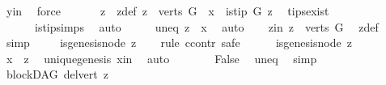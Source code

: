 \begin{isabellebody}
\ y{\isacharunderscore}{\kern0pt}in\ \isamarkupfalse%
\ force\ \isanewline
\ \ \isamarkupfalse%
\ \isamarkupfalse%
\ z\ \ z{\isacharunderscore}{\kern0pt}def{\isacharcolon}{\kern0pt}\ {\isachardoublequoteopen}z\ {\isasymin}\ {\isacharparenleft}{\kern0pt}verts\ G{\isacharparenright}{\kern0pt}\ {\isacharminus}{\kern0pt}\ {\isacharbraceleft}{\kern0pt}x{\isacharbraceright}{\kern0pt}\ {\isasymand}\ is{\isacharunderscore}{\kern0pt}tip\ G\ z{\isachardoublequoteclose}\ \isamarkupfalse%
\ tips{\isacharunderscore}{\kern0pt}exist\isanewline
\ \ \ \ \ \ is{\isacharunderscore}{\kern0pt}tip{\isachardot}{\kern0pt}simps\ \isamarkupfalse%
\ auto\isanewline
\ \ \isamarkupfalse%
\ \isamarkupfalse%
\ uneq{\isacharcolon}{\kern0pt}\ {\isachardoublequoteopen}z\ {\isasymnoteq}\ x{\isachardoublequoteclose}\ \isamarkupfalse%
\ auto\isanewline
\ \ \isamarkupfalse%
\ z{\isacharunderscore}{\kern0pt}in{\isacharcolon}{\kern0pt}\ {\isachardoublequoteopen}z\ {\isasymin}\ verts\ G{\isachardoublequoteclose}\ \isamarkupfalse%
\ z{\isacharunderscore}{\kern0pt}def\ \isamarkupfalse%
\ simp\isanewline
\ \ \isamarkupfalse%
\ {\isachardoublequoteopen}{\isasymnot}\ is{\isacharunderscore}{\kern0pt}genesis{\isacharunderscore}{\kern0pt}node\ z{\isachardoublequoteclose}\isanewline
\ \ \isamarkupfalse%
\ {\isacharparenleft}{\kern0pt}rule\ ccontr{\isacharcomma}{\kern0pt}\ safe{\isacharparenright}{\kern0pt}\isanewline
\ \ \ \ \isamarkupfalse%
\ {\isachardoublequoteopen}is{\isacharunderscore}{\kern0pt}genesis{\isacharunderscore}{\kern0pt}node\ z{\isachardoublequoteclose}\isanewline
\ \ \ \ \isamarkupfalse%
\ \isamarkupfalse%
\ {\isachardoublequoteopen}x\ {\isacharequal}{\kern0pt}\ z{\isachardoublequoteclose}\ \isamarkupfalse%
\ unique{\isacharunderscore}{\kern0pt}genesis\ x{\isacharunderscore}{\kern0pt}in\ \isamarkupfalse%
\ auto\isanewline
\ \ \ \ \isamarkupfalse%
\ \isamarkupfalse%
\ False\ \isamarkupfalse%
\ uneq\ \isamarkupfalse%
\ simp\isanewline
\ \ \isamarkupfalse%
\isanewline
\ \ \isamarkupfalse%
\ \isamarkupfalse%
\ {\isachardoublequoteopen}blockDAG\ {\isacharparenleft}{\kern0pt}del{\isacharunderscore}{\kern0pt}vert\ z{\isacharparenright}{\kern0pt}{\isachardoublequoteclose}\ \isamarkupfalse%

\end{isabellebody}
